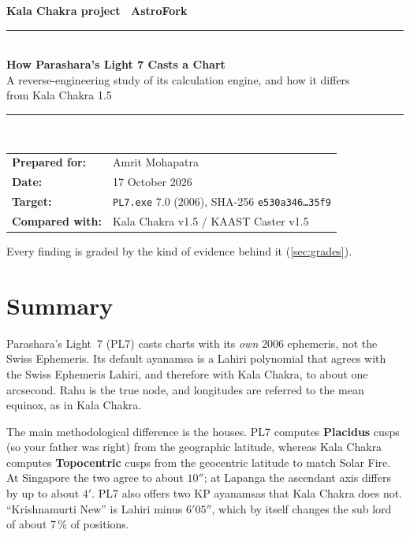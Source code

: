 \documentclass[11pt, a4paper]{article}
\DeclareRobustCommand{\_}{\textunderscore\allowbreak}
\begin{document}
\begin{titlepage}
  \centering
  \vspace*{2cm}
  {\Large\bfseries\color{midseapurple} Kala Chakra project \textbullet\ Astro\_Fork}\\[1.5cm]
  {\color{midseamagenta}\rule{\textwidth}{1.5pt}}\\[0.6em]
  {\LARGE\bfseries How Parashara's Light 7 Casts a Chart}\\[0.4em]
  {\large A reverse-engineering study of its calculation engine, and how it differs\\ from Kala Chakra 1.5}\\[0.3em]
  {\color{midseamagenta}\rule{\textwidth}{1.5pt}}\\[1.5cm]
  \begin{tabular}{ll}
    \textbf{Prepared for:} & Amrit Mohapatra \\
    \textbf{Date:} & 17 October 2026 \\
    \textbf{Target:} & \texttt{PL7.exe} 7.0 (2006), SHA-256 \texttt{e530a346\ldots 35f9} \\
    \textbf{Compared with:} & Kala Chakra v1.5 / KAAST Caster v1.5 \\
  \end{tabular}
  \vfill
  {\small Every finding is graded by the kind of evidence behind it (\autoref{sec:grades}).}
\end{titlepage}

\setcounter{tocdepth}{1}
\tableofcontents
\newpage

\section*{Summary}

Parashara's Light~7 (PL7) casts charts with its \emph{own} 2006 ephemeris, not the Swiss
Ephemeris. Its default ayanamsa is a Lahiri polynomial that agrees with the Swiss Ephemeris
Lahiri, and therefore with Kala Chakra, to about one arcsecond. Rahu is the true node, and
longitudes are referred to the mean equinox, as in Kala Chakra.

The main methodological difference is the houses. PL7 computes \textbf{Placidus} cusps (so
your father was right) from the geographic latitude, whereas Kala Chakra computes
\textbf{Topocentric} cusps from the geocentric latitude to match Solar Fire. At Singapore
the two agree to about $10''$; at Lapanga the ascendant axis differs by up to about $4'$.
PL7 also offers two KP ayanamsas that Kala Chakra does not. ``Krishnamurti New'' is
Lahiri minus $6'05''$, which by itself changes the sub lord of about 7\,\% of positions.
\end{document}
